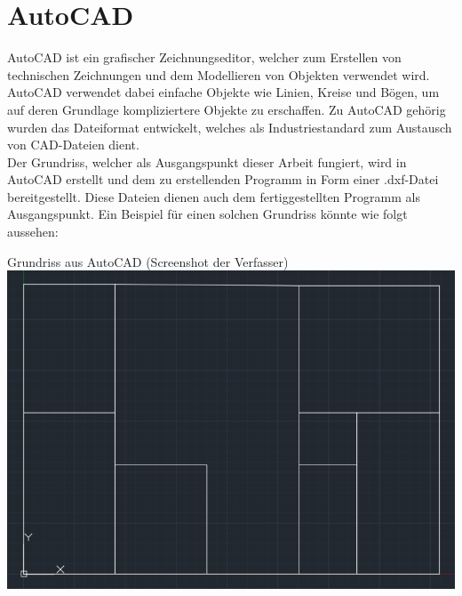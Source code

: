 \section{AutoCAD}
AutoCAD ist ein grafischer Zeichnungseditor, welcher zum Erstellen von technischen Zeichnungen und dem Modellieren von Objekten verwendet wird.
AutoCAD verwendet dabei einfache Objekte wie Linien, Kreise und Bögen, um auf deren Grundlage kompliziertere Objekte zu erschaffen.
Zu AutoCAD gehörig wurden das Dateiformat  entwickelt, welches als Industriestandard zum Austausch von CAD-Dateien dient. \\
Der Grundriss, welcher als Ausgangspunkt dieser Arbeit fungiert, wird in AutoCAD erstellt und dem zu erstellenden Programm in Form einer .dxf-Datei bereitgestellt.
Diese Dateien dienen auch dem fertiggestellten Programm als Ausgangspunkt.
Ein Beispiel für einen solchen Grundriss könnte wie folgt aussehen:
\begin{Bild}{Grundriss aus AutoCAD (Screenshot der Verfasser)}
	\includegraphics[width=\textwidth]{Bilder/Grundriss}
\end{Bild}

